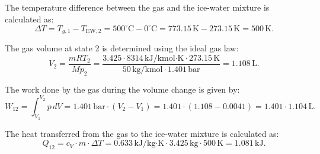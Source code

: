 The temperature difference between the gas and the ice-water mixture is calculated as:  
\[
\Delta T = T_{g,1} - T_{\text{EW},2} = 500^\circ\text{C} - 0^\circ\text{C} = 773.15 \, \text{K} - 273.15 \, \text{K} = 500 \, \text{K}.
\]

The gas volume at state 2 is determined using the ideal gas law:  
\[
V_2 = \frac{m R T_2}{M p_2} = \frac{3.425 \cdot 8314 \, \text{kJ/kmol·K} \cdot 273.15 \, \text{K}}{50 \, \text{kg/kmol} \cdot 1.401 \, \text{bar}} = 1.108 \, \text{L}.
\]

The work done by the gas during the volume change is given by:  
\[
W_{12} = \int_{V_1}^{V_2} p \, dV = 1.401 \, \text{bar} \cdot (V_2 - V_1) = 1.401 \cdot (1.108 - 0.0041) = 1.401 \cdot 1.104 \, \text{L}.
\]

The heat transferred from the gas to the ice-water mixture is calculated as:  
\[
Q_{12} = c_V \cdot m \cdot \Delta T = 0.633 \, \text{kJ/kg·K} \cdot 3.425 \, \text{kg} \cdot 500 \, \text{K} = 1.081 \, \text{kJ}.
\]